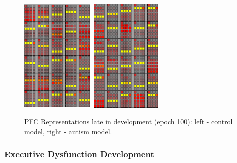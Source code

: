 \begin{figure}[th]
\begin{center}
	\includegraphics[width=35mm,height=55mm]{graphs/PFCwts1.100.eps}
	\hspace{18 mm}
	\includegraphics[width=35mm,height=55mm]{graphs/PFCwts54.100.eps}
\end{center}
\caption{PFC Representations late in development
         (epoch 100): left - control model, right -
         autism model.}  
\label{rep2-figure}
\end{figure} 


\subsubsection{Executive Dysfunction Development} 

